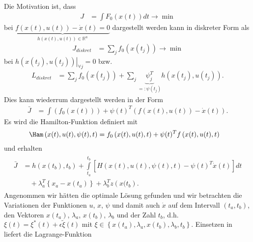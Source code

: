 Die Motivation ist, dass 
\begin{align*}
	J & = \int F_0(x(t))dt \rightarrow \min
\end{align*}
bei $\underbrace{f\left(x(t), u(t) \right)-\dot{x}(t)=0 }_{h\left(x(t),u(t) \right)\in\mathbb{R}^n }$ dargestellt werden kann in diskreter Form als
\begin{align*}
	J_{diskret} & = \sum\limits_j f_0(x(t_j))\rightarrow \min 
\end{align*}
bei $\left. h\left(x(t_j),u(t_j) \right)\right|_{\forall j}=0$ bzw.
\begin{align*}
	L_{diskret} & = \sum\limits_j f_0(x(t_j)) + \sum\limits_j \underbrace{\psi_j^T}_{=:\psi(t_j)} h\left(x(t_j),u(t_j) \right).
\end{align*}
Dies kann wiederrum dargestellt werden in der Form
\begin{align*}
	\bar{J} & = \int\left(f_0(x(t)) \right) + \psi(t)^T\left(f(x(t),u(t))-\dot{x}(t) \right).
\end{align*}
Es wird die Hamilton-Funktion definiert mit
\begin{align*}
	\Ham\left(x(t),u(t),\psi(t),t \right) & = f_0\left(x(t),u(t),t \right) + \psi(t)^T f\left(x(t),u(t),t \right)
\end{align*}
und erhalten 
\begin{align}
	\begin{split}\label{eqn:kap_2_lagrange_fun}
		\bar{J} & = h\left(x(t_b),t_b \right) + \int\limits_{t_a}^{t_b}\left[H\left(x(t),u(t),\psi(t),t \right)-\psi(t)^T\dot{x}(t) \right]dt\\
				& \quad +\lambda_a^T\left\{x_a-x(t_a) \right\} + \lambda_b^T z\left(x(t_b\right).
	\end{split}
\end{align}
Angenommen wir hätten die optimale Lösung gefunden und wir betrachten die Variationen der Funktionen $u$, $x$, $\psi$ und damit auch $\dot{x}$ auf dem
Intervall $\left(t_a, t_b \right)$, den Vektoren $x(t_a)$, $\lambda_a$, $x(t_b)$, $\lambda_b$ und der Zahl $t_b$, d.h.
$\xi(t)=\xi^{\ast}(t)+\epsilon\tilde{\xi}(t)$ mit $\xi\in\left\{x(t_a),\lambda_a, x(t_b), \lambda_b, t_b\right\}$. Einsetzen in
 liefert die Lagrange-Funktion
